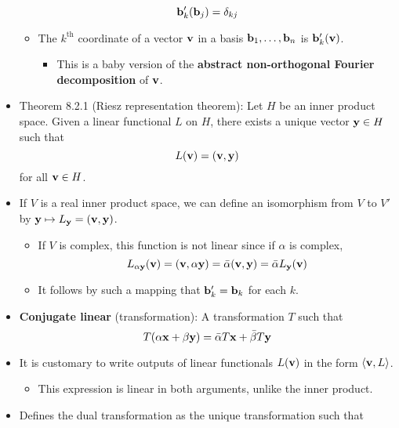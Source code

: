 \documentclass[../../notes.tex]{subfiles}
\begin{document}
\begin{itemize}
\begin{equation*}
        \mathbf{b}_k'(\mathbf{b}_j) = \delta_{kj}
    \end{equation*}
    \begin{itemize}
        \item The $k^\text{th}$ coordinate of a vector $\mathbf{v}$ in a basis $\mathbf{b}_1,\dots,\mathbf{b}_n$ is $\mathbf{b}_k'(\mathbf{v})$.
        \begin{itemize}
            \item This is a baby version of the \textbf{abstract non-orthogonal Fourier decomposition} of $\mathbf{v}$.
        \end{itemize}
    \end{itemize}
    \item Theorem 8.2.1 (Riesz representation theorem): Let $H$ be an inner product space. Given a linear functional $L$ on $H$, there exists a unique vector $\mathbf{y}\in H$ such that
    \begin{equation*}
        L(\mathbf{v}) = (\mathbf{v},\mathbf{y})
    \end{equation*}
    for all $\mathbf{v}\in H$.
    \item If $V$ is a real inner product space, we can define an isomorphism from $V$ to $V'$ by $\mathbf{y}\mapsto L_{\mathbf{y}}=(\mathbf{v},\mathbf{y})$.
    \begin{itemize}
        \item If $V$ is complex, this function is not linear since if $\alpha$ is complex,
        \begin{equation*}
            L_{\alpha\mathbf{y}}(\mathbf{v}) = (\mathbf{v},\alpha\mathbf{y}) = \bar{\alpha}(\mathbf{v},\mathbf{y}) = \bar{\alpha}L_{\mathbf{y}}(\mathbf{v})
        \end{equation*}
        \item It follows by such a mapping that $\mathbf{b}_k'=\mathbf{b}_k$ for each $k$.
    \end{itemize}
    \item \textbf{Conjugate linear} (transformation): A transformation $T$ such that
    \begin{equation*}
        T(\alpha\mathbf{x}+\beta\mathbf{y}) = \bar{\alpha}T\mathbf{x}+\bar{\beta}T\mathbf{y}
    \end{equation*}
    \item It is customary to write outputs of linear functionals $L(\mathbf{v})$ in the form $\langle\mathbf{v}, L\rangle$.
    \begin{itemize}
        \item This expression is linear in both arguments, unlike the inner product.
    \end{itemize}
    \item Defines the dual transformation as the unique transformation such that

\end{itemize}
\end{document}
